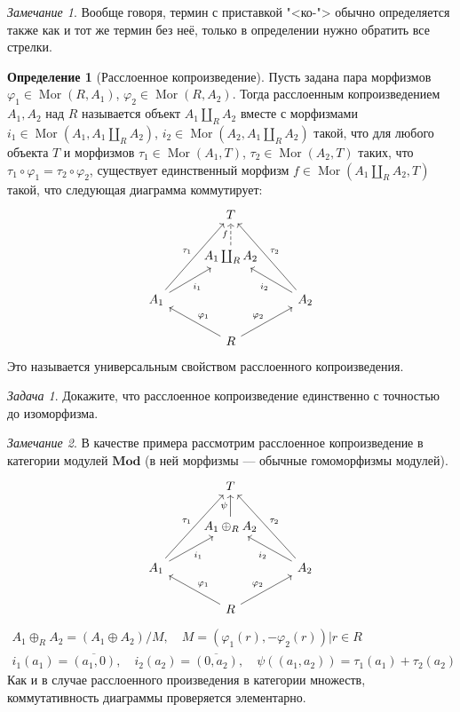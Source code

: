 \documentclass{article}
\theoremstyle{definition}
\newtheorem*{definition}{Определение}
\theoremstyle{remark}
\newtheorem*{remark}{Замечание}
\newtheorem{prb}{Задача}
\newenvironment{problem}
{\begin{prb}
\label{\theprb}}
{\end{prb}}
\DeclareMathOperator{\Mor}{Mor}
\begin{document}
\begin{remark}
    Вообще говоря, термин с приставкой "<ко-"> обычно определяется также как и тот же термин без неё, только в определении нужно обратить все стрелки.
\end{remark}

\begin{definition}[Расслоенное копроизведение]
    Пусть задана пара морфизмов $\varphi_1 \in \Mor(R, A_1)$, $\varphi_2 \in \Mor(R, A_2)$. Тогда расслоенным копроизведением $A_1, A_2$ над $R$ называется объект $A_1 \coprod_R A_2$ вместе с морфизмами $i_1 \in \Mor(A_1, A_1 \coprod_R A_2)$, $i_2 \in \Mor(A_2, A_1 \coprod_R A_2)$ такой, что для любого объекта $T$ и морфизмов $\tau_1 \in \Mor(A_1, T)$, $\tau_2 \in \Mor(A_2, T)$ таких, что $\tau_1 \circ \varphi_1 = \tau_2 \circ \varphi_2$, существует единственный морфизм $f \in \Mor(A_1 \coprod_R A_2, T)$ такой, что следующая диаграмма коммутирует:
    \begin{equation*}
    \begin{tikzcd}
        & T & \\
        & A_1 \coprod_R A_2 \ar[dashed]{u}{f} & \\
        A_1 \ar[swap]{ur}{i_1} \ar{uur}{\tau_1} & & A_2 \ar{ul}{i_2} \ar[swap]{uul}{\tau_2}  \\
        & R \ar[swap]{ul}{\varphi_1} \ar{ur}{\varphi_2} &
    \end{tikzcd}
    \end{equation*}
    Это называется универсальным свойством расслоенного копроизведения.
\end{definition}

\begin{problem}
    Докажите, что расслоенное копроизведение единственно с точностью до изоморфизма.
\end{problem}

\begin{remark}
    В качестве примера рассмотрим расслоенное копроизведение в категории модулей $\mathbf{Mod}$ (в ней морфизмы --- обычные гомоморфизмы модулей).
    \begin{equation*}
    \begin{tikzcd}
        & T & \\
        & A_1 \oplus_R A_2 \ar{u}{\psi} & \\
        A_1 \ar[swap]{ur}{i_1} \ar{uur}{\tau_1} & & A_2 \ar{ul}{i_2} \ar[swap]{uul}{\tau_2}  \\
        & R \ar[swap]{ul}{\varphi_1} \ar{ur}{\varphi_2} &
    \end{tikzcd}
    \end{equation*}
    \begin{gather*}
        A_1 \oplus_R A_2 = (A_1 \oplus A_2) / M, \quad M = {(\varphi_1(r), -\varphi_2(r)) | r \in R} \\
        i_1(a_1) = \overline{(a_1, 0)}, \quad i_2(a_2) = \overline{(0, a_2)}, \quad \psi((a_1, a_2)) = \tau_1(a_1) + \tau_2(a_2)
    \end{gather*}
    Как и в случае расслоенного произведения в категории множеств, коммутативность диаграммы проверяется элементарно.
\end{remark}
\end{document}
